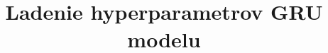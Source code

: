\documentclass[]{KKUIzaverecnaPraca}
\title{Ladenie hyperparametrov GRU modelu}
\begin{document}
\renewcommand{\figurename}{Obrázok}	
\renewcommand\theHfigure{\theHsection.\arabic{figure}}
\renewcommand\theHtable{\theHsection.\arabic{table}}


\prvastrana

\titulnastrana



%
%

\abstraktsk %

\abstrakteng %

\kabstrakt %

\zadanieprace

\cestnevyhlasenie

%
%
\end{document}
